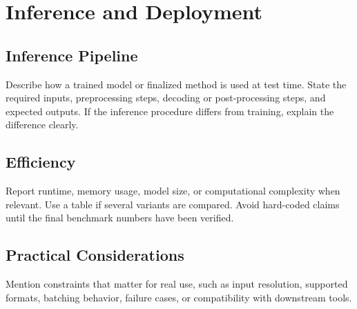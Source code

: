 \section{Inference and Deployment}

\subsection{Inference Pipeline}

Describe how a trained model or finalized method is used at test time.
State the required inputs, preprocessing steps, decoding or post-processing steps, and expected outputs.
If the inference procedure differs from training, explain the difference clearly.

\subsection{Efficiency}

Report runtime, memory usage, model size, or computational complexity when relevant.
Use a table if several variants are compared.
Avoid hard-coded claims until the final benchmark numbers have been verified.

\subsection{Practical Considerations}

Mention constraints that matter for real use, such as input resolution, supported formats, batching behavior, failure cases, or compatibility with downstream tools.
